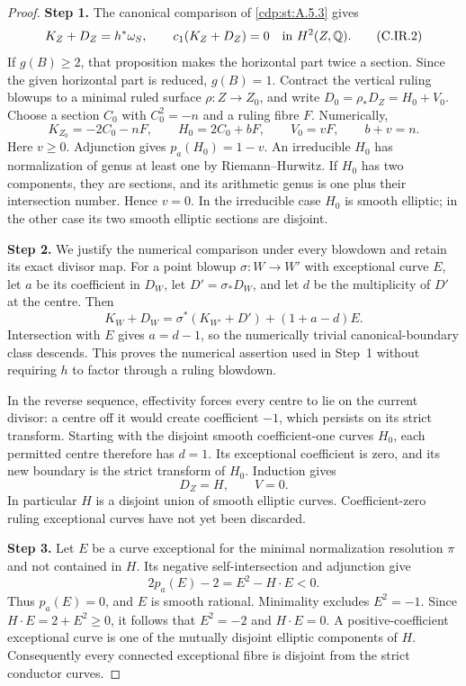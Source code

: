 \begin{proof}
\noindent\textbf{Step 1.} The canonical comparison of
\ref{cdp:st:A.5.3} gives
\[
 K_Z+D_Z=h^*\omega_S,\qquad c_1(K_Z+D_Z)=0
 \quad\hbox{in }H^2(Z,\mathbb Q).
 \tag{C.IR.2}\label{cdp:eq:C.IR.2}
\]
If $g(B)\ge2$, that proposition makes the horizontal part
twice a section.  Since the given horizontal part is reduced,
$g(B)=1$.  Contract the vertical ruling blowups to a minimal
ruled surface $\rho:Z\to Z_0$, and write
$D_0=\rho_*D_Z=H_0+V_0$.  Choose a section $C_0$ with
$C_0^2=-n$ and a ruling fibre $F$.  Numerically,
\[
 K_{Z_0}=-2C_0-nF,\qquad H_0=2C_0+bF,\qquad V_0=vF,
 \qquad b+v=n.
\]
Here $v\ge0$.  Adjunction gives $p_a(H_0)=1-v$.
An irreducible $H_0$ has normalization of genus at least one
by Riemann--Hurwitz.  If $H_0$ has two components, they are
sections, and its arithmetic genus is one plus their
intersection number.  Hence $v=0$.  In the irreducible case
$H_0$ is smooth elliptic; in the other case its two smooth
elliptic sections are disjoint.

\noindent\textbf{Step 2.} We justify the numerical comparison
under every blowdown and retain its exact divisor map.
For a point blowup $\sigma:W\to W'$ with exceptional curve
$E$, let $a$ be its coefficient in $D_W$, let
$D'=\sigma_*D_W$, and let $d$ be the multiplicity of $D'$
at the centre.  Then
\[
 K_W+D_W=\sigma^*(K_{W'}+D')+(1+a-d)E.
 \tag{C.IR.4}\label{cdp:eq:C.IR.4}
\]
Intersection with $E$ gives $a=d-1$, so the numerically
trivial canonical-boundary class descends.  This proves
the numerical assertion used in Step~1 without requiring
$h$ to factor through a ruling blowdown.

In the reverse sequence, effectivity forces every centre
to lie on the current divisor: a centre off it would create
coefficient $-1$, which persists on its strict transform.
Starting with the disjoint smooth coefficient-one curves
$H_0$, each permitted centre therefore has $d=1$.  Its
exceptional coefficient is zero, and its new boundary is
the strict transform of $H_0$.  Induction gives
\[
                         D_Z=H,\qquad V=0.
 \tag{C.IR.5}\label{cdp:eq:C.IR.5}
\]
In particular $H$ is a disjoint union of smooth elliptic
curves.  Coefficient-zero ruling exceptional curves have
not yet been discarded.

\noindent\textbf{Step 3.} Let $E$ be a curve exceptional for
the minimal normalization resolution $\pi$ and not contained
in $H$.  Its negative self-intersection and adjunction give
\[
 2p_a(E)-2=E^2-H\cdot E<0.
\]
Thus $p_a(E)=0$, and $E$ is smooth rational.  Minimality
excludes $E^2=-1$.  Since $H\cdot E=2+E^2\ge0$, it follows
that $E^2=-2$ and $H\cdot E=0$.  A positive-coefficient
exceptional curve is one of the mutually disjoint elliptic
components of $H$.  Consequently every connected exceptional
fibre is disjoint from the strict conductor curves.


\end{proof}
